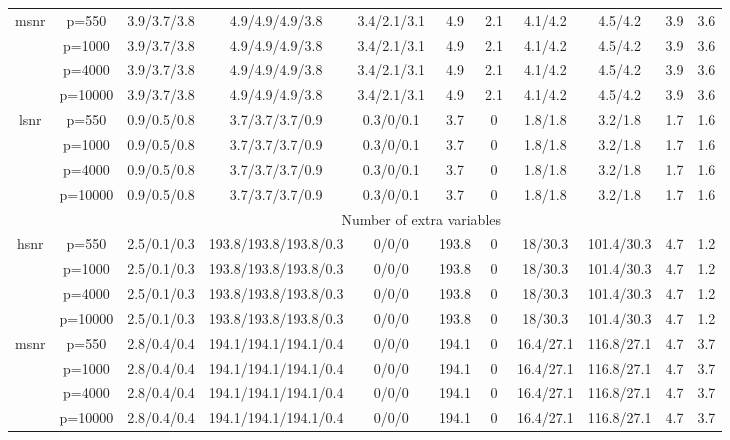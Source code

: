 \begin{table}[ht]
{\begin{tabular}{|c|c|ccccccccc|}
  \midrule\multirow{4}[2]{*}{msnr} & p=550 & 3.9/3.7/3.8 & 4.9/4.9/4.9/3.8 & 3.4/2.1/3.1 & 4.9 & 2.1 & 4.1/4.2 & 4.5/4.2 & 3.9 & 3.6 \\ 
   & p=1000 & 3.9/3.7/3.8 & 4.9/4.9/4.9/3.8 & 3.4/2.1/3.1 & 4.9 & 2.1 & 4.1/4.2 & 4.5/4.2 & 3.9 & 3.6 \\ 
   & p=4000 & 3.9/3.7/3.8 & 4.9/4.9/4.9/3.8 & 3.4/2.1/3.1 & 4.9 & 2.1 & 4.1/4.2 & 4.5/4.2 & 3.9 & 3.6 \\ 
   & p=10000 & 3.9/3.7/3.8 & 4.9/4.9/4.9/3.8 & 3.4/2.1/3.1 & 4.9 & 2.1 & 4.1/4.2 & 4.5/4.2 & 3.9 & 3.6 \\ 
  \midrule\multirow{4}[2]{*}{lsnr} & p=550 & 0.9/0.5/0.8 & 3.7/3.7/3.7/0.9 & 0.3/0/0.1 & 3.7 & 0 & 1.8/1.8 & 3.2/1.8 & 1.7 & 1.6 \\ 
   & p=1000 & 0.9/0.5/0.8 & 3.7/3.7/3.7/0.9 & 0.3/0/0.1 & 3.7 & 0 & 1.8/1.8 & 3.2/1.8 & 1.7 & 1.6 \\ 
   & p=4000 & 0.9/0.5/0.8 & 3.7/3.7/3.7/0.9 & 0.3/0/0.1 & 3.7 & 0 & 1.8/1.8 & 3.2/1.8 & 1.7 & 1.6 \\ 
   & p=10000 & 0.9/0.5/0.8 & 3.7/3.7/3.7/0.9 & 0.3/0/0.1 & 3.7 & 0 & 1.8/1.8 & 3.2/1.8 & 1.7 & 1.6 \\ 
   \midrule 
 \multicolumn{1}{|c}{} &       & \multicolumn{9}{c|}{Number of extra variables} \\
\midrule\multirow{4}[2]{*}{hsnr} & p=550 & 2.5/0.1/0.3 & 193.8/193.8/193.8/0.3 & 0/0/0 & 193.8 & 0 & 18/30.3 & 101.4/30.3 & 4.7 & 1.2 \\ 
   & p=1000 & 2.5/0.1/0.3 & 193.8/193.8/193.8/0.3 & 0/0/0 & 193.8 & 0 & 18/30.3 & 101.4/30.3 & 4.7 & 1.2 \\ 
   & p=4000 & 2.5/0.1/0.3 & 193.8/193.8/193.8/0.3 & 0/0/0 & 193.8 & 0 & 18/30.3 & 101.4/30.3 & 4.7 & 1.2 \\ 
   & p=10000 & 2.5/0.1/0.3 & 193.8/193.8/193.8/0.3 & 0/0/0 & 193.8 & 0 & 18/30.3 & 101.4/30.3 & 4.7 & 1.2 \\ 
  \midrule\multirow{4}[2]{*}{msnr} & p=550 & 2.8/0.4/0.4 & 194.1/194.1/194.1/0.4 & 0/0/0 & 194.1 & 0 & 16.4/27.1 & 116.8/27.1 & 4.7 & 3.7 \\ 
   & p=1000 & 2.8/0.4/0.4 & 194.1/194.1/194.1/0.4 & 0/0/0 & 194.1 & 0 & 16.4/27.1 & 116.8/27.1 & 4.7 & 3.7 \\ 
   & p=4000 & 2.8/0.4/0.4 & 194.1/194.1/194.1/0.4 & 0/0/0 & 194.1 & 0 & 16.4/27.1 & 116.8/27.1 & 4.7 & 3.7 \\ 
   & p=10000 & 2.8/0.4/0.4 & 194.1/194.1/194.1/0.4 & 0/0/0 & 194.1 & 0 & 16.4/27.1 & 116.8/27.1 & 4.7 & 3.7 \\ 

\end{tabular}}
\end{table}

